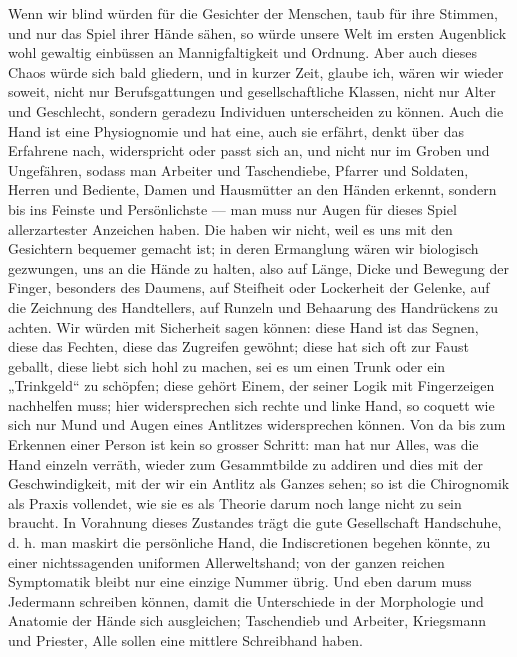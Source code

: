 Wenn wir blind würden für die Gesichter der Menschen, taub für ihre Stimmen, und nur das Spiel ihrer Hände sähen, so würde unsere Welt im ersten Augenblick wohl gewaltig einbüssen an Mannigfaltigkeit und Ordnung. Aber auch dieses Chaos würde sich bald gliedern, und in kurzer Zeit, glaube ich, wären wir wieder soweit, nicht nur Berufsgattungen und gesellschaftliche Klassen, nicht nur Alter und Geschlecht, sondern geradezu Individuen unterscheiden zu können. Auch die Hand ist eine Physiognomie und hat eine, auch sie erfährt, denkt über das Erfahrene nach, widerspricht oder passt sich an, und nicht nur im Groben und Ungefähren, sodass man Arbeiter und Taschendiebe, Pfarrer und Soldaten, Herren und Bediente, Damen und Hausmütter an den Händen erkennt, sondern bis ins Feinste und Persönlichste — man muss nur Augen für dieses Spiel allerzartester Anzeichen haben. Die haben wir nicht, weil es uns mit den Gesichtern bequemer gemacht ist; in deren Ermanglung wären wir biologisch gezwungen, uns an die Hände zu halten, also auf Länge, Dicke und Bewegung der Finger, besonders des Daumens, auf Steifheit oder Lockerheit der Gelenke, auf die Zeichnung des Handtellers, auf Runzeln und Behaarung des Handrückens zu achten. Wir würden mit Sicherheit sagen können: diese Hand ist das Segnen, diese das Fechten, diese das Zugreifen gewöhnt; diese hat sich oft zur Faust geballt, diese liebt sich hohl zu machen, sei es um einen Trunk oder ein „Trinkgeld“ zu schöpfen; diese gehört Einem, der seiner Logik mit Fingerzeigen nachhelfen muss; hier widersprechen sich rechte und linke Hand, so coquett wie sich nur Mund und Augen eines Antlitzes widersprechen können. Von da bis zum Erkennen einer Person ist kein so grosser Schritt: man hat nur Alles, was die Hand einzeln verräth, wieder zum Gesammtbilde zu addiren und dies mit der Geschwindigkeit, mit der wir ein Antlitz als Ganzes sehen; so ist die Chirognomik als Praxis vollendet, wie sie es als Theorie darum noch lange nicht zu sein braucht. In Vorahnung dieses Zustandes trägt die gute Gesellschaft Handschuhe, d. h. man maskirt die persönliche Hand, die Indiscretionen begehen könnte, zu einer nichtssagenden uniformen Allerweltshand; von der ganzen reichen Symptomatik bleibt nur eine einzige Nummer übrig. Und eben darum muss Jedermann schreiben können, damit die Unterschiede in der Morphologie und Anatomie der Hände sich ausgleichen; Taschendieb und Arbeiter, Kriegsmann und Priester, Alle sollen eine mittlere Schreibhand haben.
\par

